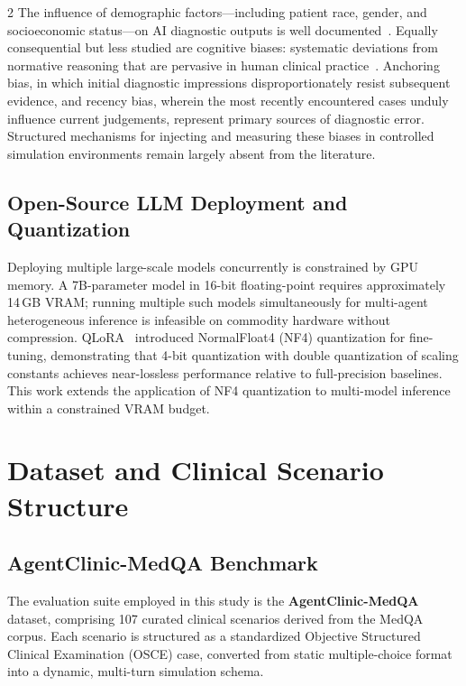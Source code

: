 \documentclass[10pt, a4paper]{article}
\begin{document}
\begin{multicols}{2}
The influence of demographic factors—including patient race, gender, and socioeconomic status—on AI diagnostic outputs is well documented~\cite{obermeyer2019dissecting}. Equally consequential but less studied are cognitive biases: systematic deviations from normative reasoning that are pervasive in human clinical practice~\cite{croskerry2002achieving}. Anchoring bias, in which initial diagnostic impressions disproportionately resist subsequent evidence, and recency bias, wherein the most recently encountered cases unduly influence current judgements, represent primary sources of diagnostic error. Structured mechanisms for injecting and measuring these biases in controlled simulation environments remain largely absent from the literature.

\subsection{Open-Source LLM Deployment and Quantization}

Deploying multiple large-scale models concurrently is constrained by GPU memory. A 7B-parameter model in 16-bit floating-point requires approximately 14\,GB VRAM; running multiple such models simultaneously for multi-agent heterogeneous inference is infeasible on commodity hardware without compression. QLoRA~\cite{dettmers2023qlora} introduced NormalFloat4 (NF4) quantization for fine-tuning, demonstrating that 4-bit quantization with double quantization of scaling constants achieves near-lossless performance relative to full-precision baselines. This work extends the application of NF4 quantization to multi-model inference within a constrained VRAM budget.


\section{Dataset and Clinical Scenario Structure}
\label{sec:dataset}

\subsection{AgentClinic-MedQA Benchmark}

The evaluation suite employed in this study is the \textbf{AgentClinic-MedQA} dataset, comprising 107 curated clinical scenarios derived from the MedQA corpus. Each scenario is structured as a standardized Objective Structured Clinical Examination (OSCE) case, converted from static multiple-choice format into a dynamic, multi-turn simulation schema.


\end{multicols}
\end{document}
